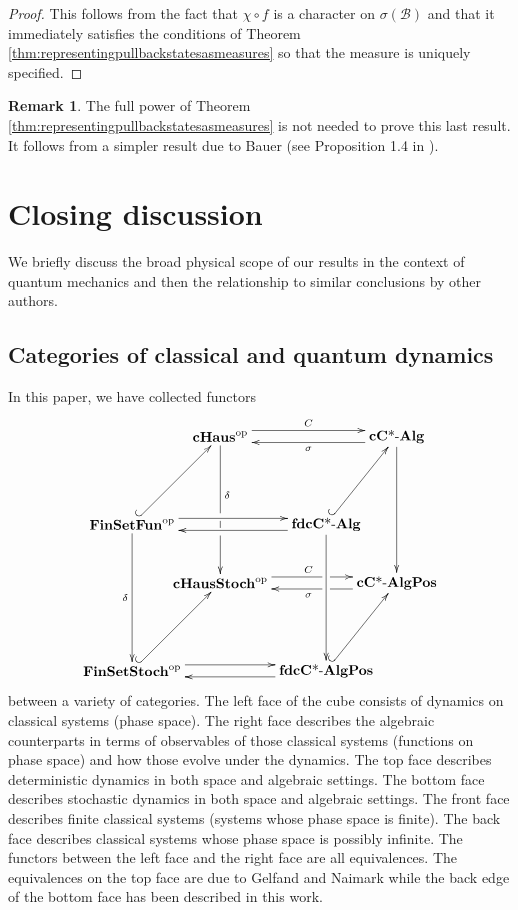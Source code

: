 \documentclass[12pt]{article}
\edef\t{\pgfmathresult}%
\theoremstyle{theorem}
\theoremstyle{definition}
\newtheorem{remark}[equation]{Remark}
\numberwithin{equation}{section}
\let\s=\sigma \let\t=\tau \let\u=\upsilon \let\f=\phi \let\c=\chi
\newcommand{\be}{\begin{equation}}
\newcommand{\ee}{\end{equation}}
\newcommand{\bprf}{\begin{proof}}
\newcommand{\eprf}{\end{proof}}
\newcommand{\br}{\begin{remark}}
\newcommand{\er}{\end{remark}}
\newcommand{\<}{\langle}
\renewcommand{\>}{\rangle}
\newcommand{\cCAlg}{\mathbf{cC\text{*-}Alg}}
\newcommand{\fdcCAlg}{\mathbf{fdcC\text{*-}Alg}}
\newcommand{\cCAlgPos}{\mathbf{cC\text{*-}AlgPos}}
\newcommand{\fdcCAlgPos}{\mathbf{fdcC\text{*-}AlgPos}}
\def\mB{{{\mathcal{B}}}}
\newcommand{\FinSetFun}{\mathbf{FinSetFun}}
\newcommand{\FinSetStoch}{\mathbf{FinSetStoch}}
\newcommand{\op}{\mathrm{op}}
\newcommand{\cH}{\mathbf{cHaus}}
\newcommand{\cHStoch}{\mathbf{cHausStoch}}
\begin{document}
\bprf
This follows from the fact that $\chi\circ f$ is a character on $\s(\mB)$ 
and that it immediately satisfies the conditions of Theorem 
\ref{thm:representingpullbackstatesasmeasures}
so that the measure is uniquely specified. 
\eprf

\br
The full power of Theorem 
\ref{thm:representingpullbackstatesasmeasures}
is not needed to prove this last result. It follows from a simpler result
due to Bauer (see Proposition 1.4 in \cite{Ph01}).
\er

\section{Closing discussion}
\label{sec:closing}
We briefly discuss the broad physical scope of our results in the context
of quantum mechanics and then the relationship to similar 
conclusions by other authors. 

\subsection{Categories of classical and quantum dynamics}
\label{sec:theclassicalcube}

In this paper, we have collected functors 
\be
\xy0;/r.35pc/:
(-15,20)*+{\cH^{\op}}="cHaus";
(-15,-5)*+{\cHStoch^{\op}}="cHausStoch";
(15,20)*+{\cCAlg}="cCAlg";
(15,-5)*+{\cCAlgPos}="cCAlgPos";
(-30,5)*+{\FinSetFun^{\op}}="FinSetFun";
(-30,-20)*+{\FinSetStoch^{\op}}="FinSetStoch";
(3,5)*+{\fdcCAlg}="fdcCAlg";
(3,-20)*+{\fdcCAlgPos}="fdcCAlgPos";
{\ar@<1.0ex>"cHaus";"cCAlg"^{C}};
{\ar@<1.0ex>"cCAlg";"cHaus"^{\s}};
{\ar@<1.0ex>|(0.6){\hole}"cHausStoch";"cCAlgPos"^{C}};
{\ar@<1.0ex>|(0.4){\hole}"cCAlgPos";"cHausStoch"^{\s}};
{\ar@<1.0ex>"FinSetFun";"fdcCAlg"};
{\ar@<1.0ex>"fdcCAlg";"FinSetFun"};
{\ar@<1.0ex>"FinSetStoch";"fdcCAlgPos"};
{\ar@<1.0ex>"fdcCAlgPos";"FinSetStoch"};
{\ar@{^{(}->}"FinSetFun";"cHaus"};
{\ar@{^{(}->}"FinSetStoch";"cHausStoch"};
{\ar@{^{(}->}"fdcCAlg";"cCAlg"};
{\ar@{^{(}->}"fdcCAlgPos";"cCAlgPos"};
{\ar"FinSetFun";"FinSetStoch"_{\de}};
{\ar|(0.55){\hole}|(0.65){\hole}"cHaus";"cHausStoch"^(0.4){\de}};
{\ar"fdcCAlg";"fdcCAlgPos"};
{\ar"cCAlg";"cCAlgPos"};
\endxy
\ee
between a variety of categories. The left face of the cube
consists of dynamics on classical systems (phase space). 
The right face describes the algebraic counterparts in terms of observables
of those classical systems (functions on phase space) and how those evolve
under the dynamics. The top face describes 
deterministic dynamics in both space and algebraic settings. 
The bottom face describes stochastic dynamics 
in both space and algebraic settings. 
The front face describes finite classical systems (systems whose phase
space is finite). 
The back face describes classical systems whose phase space is
possibly infinite.
The functors between the left face and the right face are all equivalences.
The equivalences on the top face are due to Gelfand and Naimark
while the back edge of the bottom face has been described in this work. 
\end{document}
